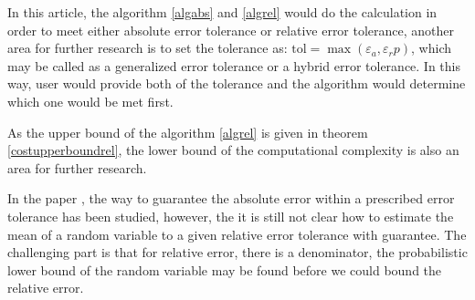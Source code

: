 \documentclass{iitthesis}
\begin{document}
In this article, the algorithm \ref{algabs} and \ref{algrel} would do the calculation in order to meet either absolute error tolerance or relative error tolerance, another area for further research is to set the tolerance as: $\text{tol} = \max(\varepsilon_a, \varepsilon_r p)$, which may be called as a generalized error tolerance or a hybrid error tolerance. In this way, user would provide both of the tolerance and the algorithm would determine which one would be met first.

As the upper bound of the algorithm \ref{algrel} is given in theorem \ref{costupperboundrel}, the lower bound of the computational complexity is also an area for further research. 

In the paper \cite{HJLO12}, the way to guarantee the absolute error within a prescribed error tolerance has been studied, however, the it is still not clear how to estimate the mean of a random variable to a given relative error tolerance with guarantee. The challenging part is that for relative error, there is a denominator, the probabilistic lower bound of the random variable may be found before we could bound the relative error.





%



%
%
%
\end{document}
